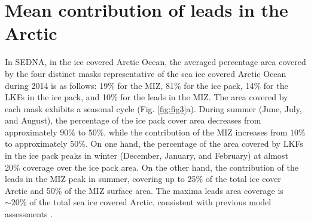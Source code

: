 \documentclass[lineno,sn-basic]{sn-jnl}%
\begin{document}
\section{Mean contribution of leads in the Arctic}\label{sec3}

In SEDNA, in the ice covered Arctic Ocean, the averaged percentage area covered by the four distinct masks representative of the sea ice covered Arctic Ocean during 2014 is as follows: 19\% for the MIZ, 81\% for the ice pack, 14\% for the LKFs in the ice pack, and 10\% for the leads in the MIZ. 
The area covered by each mask exhibits a seasonal cycle (Fig. \ref{fig:fig3}a). During summer (June, July, and August), the percentage of the ice pack cover area decreases from approximately $90\%$ to $50\%$, while the contribution of the MIZ increases from $10\%$ to approximately $50\%$. 
On one hand, the percentage of the area covered by LKFs in the ice pack peaks in winter (December, January, and February) at almost 20\% coverage over the ice pack area. On the other hand, the contribution of the leads in the MIZ peak in summer, covering up to 25\% of the total ice cover Arctic and 50\% of the MIZ surface area. The maxima leads area coverage is $\sim 20\%$ of the total sea ice covered Arctic, consistent with previous model assessments \citep{Wang_leads_2016}. 
\end{document}
